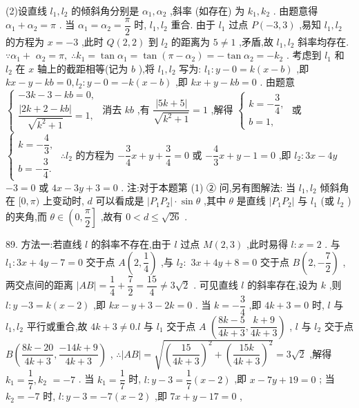 (2)设直线 ${l}_{1},{l}_{2}$ 的倾斜角分别是 ${\alpha }_{1},{\alpha }_{2}$ ,斜率 (如存在) 为 ${k}_{1},{k}_{2}$ . 由题意得 ${\alpha }_{1} + {\alpha }_{2} = \pi$ . 当 ${\alpha }_{1} = {\alpha }_{2} = \dfrac{\pi }{2}$ 时, ${l}_{1},{l}_{2}$ 重合. 由于 ${l}_{1}$ 过点 $P\left( {-3,3}\right)$ ,易知 ${l}_{1},{l}_{2}$ 的方程为 $x =  - 3$ ,此时 $Q\left( {2,2}\right)$ 到 ${l}_{2}$ 的距离为 $5 \neq  1$ ,矛盾,故 ${l}_{1},{l}_{2}$ 斜率均存在. $\because {\alpha }_{1} +$  ${\alpha }_{2} = \pi ,\;\therefore {k}_{1} = \tan {\alpha }_{1} = \tan \left( {\pi  - {\alpha }_{2}}\right)  =  - \tan {\alpha }_{2} =  - {k}_{2}$ . 考虑到 ${l}_{1}$ 和 ${l}_{2}$ 在 $x$ 轴上的截距相等(记为 $b$ ),将 ${l}_{1},{l}_{2}$ 写为: ${l}_{1} : y - 0 = k\left( {x - b}\right)$ ,即 ${kx} - y - {kb} = 0,{l}_{2} : y - 0 =  - k\left( {x - b}\right)$ ,即 ${kx} + y - {kb} = 0$ . 由题意 $\left\{  \begin{array}{l}  - {3k} - 3 - {kb} = 0, \\  \dfrac{\left| 2k + 2 - kb\right| }{\sqrt{{k}^{2} + 1}} = 1, \end{array}\right.$ 消去 ${kb}$ ,有 $\dfrac{\left| 5k + 5\right| }{\sqrt{{k}^{2} + 1}} = 1$ ,解得 $\left\{  \begin{array}{l} k =  - \dfrac{3}{4}, \\  b = 1, \end{array}\right.$ 或 $\left\{  {\begin{array}{l} k =  - \dfrac{4}{3}, \\  b =  - \dfrac{3}{4}. \end{array}\;\therefore {l}_{2}}\right.$ 的方程为 $- \dfrac{3}{4}x + y + \dfrac{3}{4} = 0$ 或 $- \dfrac{4}{3}x + y - 1 = 0$ ,即 ${l}_{2} : {3x} - {4y}$  $- 3 = 0$ 或 ${4x} - {3y} + 3 = 0$ . 注:对于本题第 (1) ② 问,另有图解法: 当 ${l}_{1},{l}_{2}$ 倾斜角在 $\lbrack 0,\pi )$ 上变动时, $d$ 可以看成是 $\left| {{P}_{1}{P}_{2}}\right|  \cdot  \sin \theta$ ,其中 $\theta$ 是直线 $\left| {{P}_{1}{P}_{2}}\right|$ 与 ${l}_{1}$ (或 ${l}_{2}$ )的夹角,而 $\theta  \in  \left( {0,\dfrac{\pi }{2}}\right\rbrack$ ,故有 $0 < d \leq  \sqrt{26}$ .

89. 方法一:若直线 $l$ 的斜率不存在,由于 $l$ 过点 $M\left( {2,3}\right)$ ,此时易得 $l : x = 2$ . 与 ${l}_{1} : {3x} + {4y} - 7 = 0$ 交于点 $A\left( {2,\dfrac{1}{4}}\right)$ ,与 ${l}_{2} :$  ${3x} + {4y} + 8 = 0$ 交于点 $B\left( {2, - \dfrac{7}{2}}\right)$ ,两交点间的距离 $\left| {AB}\right|  = \dfrac{1}{4} + \dfrac{7}{2} = \dfrac{15}{4} \neq  3\sqrt{2}$ . 可见直线 $l$ 的斜率存在,设为 $k$ ,则 $l : y$  $- 3 = k\left( {x - 2}\right)$ ,即 ${kx} - y + 3 - {2k} = 0$ . 当 $k =  - \dfrac{3}{4}$ ,即 ${4k} + 3 = 0$ 时, $l$ 与 ${l}_{1},{l}_{2}$ 平行或重合,故 ${4k} + 3 \neq  0.l$ 与 ${l}_{1}$ 交于点 $A$  $\left( {\dfrac{{8k} - 5}{{4k} + 3},\dfrac{k + 9}{{4k} + 3}}\right)$ , $l$ 与 ${l}_{2}$ 交于点 $B\left( {\dfrac{{8k} - {20}}{{4k} + 3},\dfrac{-{14k} + 9}{{4k} + 3}}\right)$ , $\therefore \left| {AB}\right|  = \sqrt{{\left( \dfrac{15}{{4k} + 3}\right) }^{2} + {\left( \dfrac{15k}{{4k} + 3}\right) }^{2}} = 3\sqrt{2}$ ,解得 ${k}_{1} = \dfrac{1}{7},{k}_{2}$  $=  - 7$ . 当 ${k}_{1} = \dfrac{1}{7}$ 时, $l : y - 3 = \dfrac{1}{7}\left( {x - 2}\right)$ ,即 $x - {7y} + {19} = 0$ ; 当 ${k}_{2} =  - 7$ 时, $l : y - 3 =  - 7\left( {x - 2}\right)$ ,即 ${7x} + y - {17} = 0$ ,

